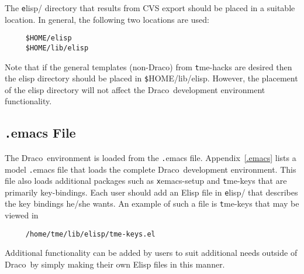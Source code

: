 \documentclass[11pt]{nmemo}
\newcommand{\comp}[1]{{\normalfont\texttt#1}}
\newcommand{\draco}{{\normalfont\sffamily Draco}}
\begin{document}
The \comp{elisp/} directory that results from CVS export should be
placed in a suitable location.  In general, the following two
locations are used:
\begin{verbatim}
     $HOME/elisp
     $HOME/lib/elisp
\end{verbatim}
Note that if the general templates (non-\draco) from \comp{tme-hacks}
are desired then the elisp directory should be placed in
\comp{\$HOME/lib/elisp}.  However, the placement of the elisp
directory will not affect the \draco\ development environment
functionality.  

\subsection{\comp{.emacs} File}

The \draco\ environment is loaded from the \comp{.emacs} file.
Appendix~\ref{.emacs} lists a model \comp{.emacs} file that loads the
complete \draco\ development environment.  This file also loads
additional packages such as \comp{xemacs-setup} and \comp{tme-keys}
that are primarily key-bindings.  Each user should add an Elisp file
in \comp{elisp/} that describes the key bindings he/she wants.  An
example of such a file is \comp{tme-keys} that may be viewed in
\begin{verbatim}
     /home/tme/lib/elisp/tme-keys.el
\end{verbatim}
Additional functionality can be added by users to suit additional
needs outside of \draco\ by simply making their own Elisp files in
this manner.
\end{document}
